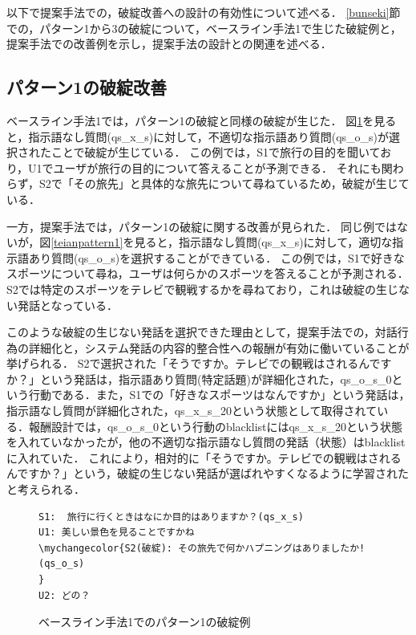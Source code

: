 \documentclass[12pt,a4paper,twoside,openany]{jbook}
\newcommand\mychangecolor[1]{\textcolor[rgb]{1,0,0}{\textbf{#1}}}
\begin{document}
以下で提案手法での，破綻改善への設計の有効性について述べる．
\ref{bunseki}節での，パターン1から3の破綻について，ベースライン手法1で生じた破綻例と，提案手法での改善例を示し，提案手法の設計との関連を述べる．

\subsection*{パターン1の破綻改善}
ベースライン手法1では，パターン1の破綻と同様の破綻が生じた．
図\ref{baseline2pattern1}を見ると，指示語なし質問(qs\_x\_s)に対して，不適切な指示語あり質問(qs\_o\_s)が選択されたことで破綻が生じている．
この例では，S1で旅行の目的を聞いており，U1でユーザが旅行の目的について答えることが予測できる．
それにも関わらず，S2で「その旅先」と具体的な旅先について尋ねているため，破綻が生じている．

一方，提案手法では，パターン1の破綻に関する改善が見られた．
同じ例ではないが，図\ref{teianpattern1}を見ると，指示語なし質問(qs\_x\_s)に対して，適切な指示語あり質問(qs\_o\_s)を選択することができている．
この例では，S1で好きなスポーツについて尋ね，ユーザは何らかのスポーツを答えることが予測される．S2では特定のスポーツをテレビで観戦するかを尋ねており，これは破綻の生じない発話となっている．

このような破綻の生じない発話を選択できた理由として，提案手法での，対話行為の詳細化と，システム発話の内容的整合性への報酬が有効に働いていることが挙げられる．
S2で選択された「そうですか。テレビでの観戦はされるんですか？」という発話は，指示語あり質問(特定話題)が詳細化された，qs\_o\_s\_0という行動である．また，S1での「好きなスポーツはなんですか」という発話は，指示語なし質問が詳細化された，qs\_x\_s\_20という状態として取得されている．報酬設計では，qs\_o\_s\_0という行動のblacklistにはqs\_x\_s\_20という状態を入れていなかったが，他の不適切な指示語なし質問の発話（状態）はblacklistに入れていた．
これにより，相対的に「そうですか。テレビでの観戦はされるんですか？」という，破綻の生じない発話が選ばれやすくなるように学習されたと考えられる．

\begin{figure}[tb]
\centering
\begin{screen}
\begin{Verbatim}[commandchars=\\\{\}]
S1:  旅行に行くときはなにか目的はありますか？(qs_x_s)
U1: 美しい景色を見ることですかね
\mychangecolor{S2(破綻): その旅先で何かハプニングはありましたか!(qs_o_s)
}
U2: どの？
\end{Verbatim}
\end{screen}
\caption{ベースライン手法1でのパターン1の破綻例}
\label{baseline2pattern1}
\end{figure}
\end{document}
